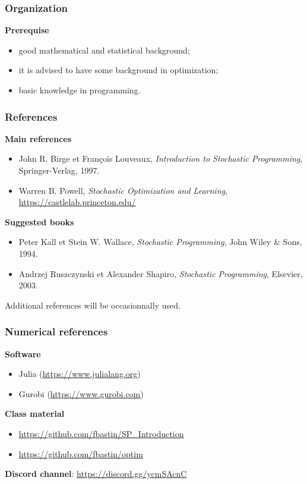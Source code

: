 \documentclass{beamer}
\begin{document}
\begin{frame}
\frametitle{Organization}

{\bf Prerequise}
\begin{itemize}
\item
good mathematical and statistical background;
\item
it is advised to have some background in optimization;
\item
basic knowledge in programming.
\end{itemize}

\end{frame}

\begin{frame}
\frametitle{References}

{\bf Main references}
\begin{itemize}
\item
John R. Birge et François Louveaux, {\sl Introduction to Stochastic
  Programming}, Springer-Verlag, 1997.
\item
Warren B. Powell, {\sl Stochastic Optimization and Learning},  \url{https://castlelab.princeton.edu/}
\end{itemize}

{\bf Suggested books}
\begin{itemize}
\item
Peter Kall et Stein W. Wallace, {\sl Stochastic Programming}, John
  Wiley \& Sons, 1994.
\item
Andrzej Ruszczynski et Alexander Shapiro, {\sl Stochastic
  Programming}, Elsevier, 2003.
\end{itemize}

Additional references will be occasionnally used.

\end{frame}

\begin{frame}
\frametitle{Numerical references}

{\bf Software}
\begin{itemize}
\item
Julia (\url{https://www.julialang.org})
\item
Gurobi (\url{https://www.gurobi.com})
\end{itemize}

\mbox{}

{\bf Class material}
\begin{itemize}
	\item
	\url{https://github.com/fbastin/SP_Introduction}
	\item
\url{https://github.com/fbastin/optim}
\end{itemize}

\mbox{}

{\bf Discord channel}: \url{https://discord.gg/ycmSAcnC}

\end{frame}
\end{document}

